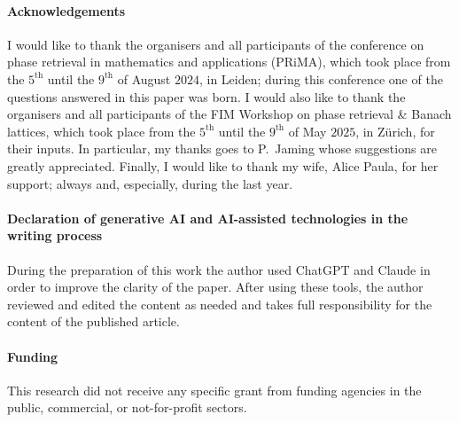 \documentclass{article}
\theoremstyle{remark}
\begin{document}
    \paragraph{Acknowledgements} I would like to thank the organisers and all participants of the conference on phase retrieval in mathematics and applications (PRiMA), which took place from the $5^\mathrm{th}$ until the $9^\mathrm{th}$ of August $2024$, in Leiden; during this conference one of the questions answered in this paper was born. I would also like to thank the organisers and all participants of the FIM Workshop on phase retrieval \& Banach lattices, which took place from the $5^\mathrm{th}$ until the $9^\mathrm{th}$ of May $2025$, in Z{\"u}rich, for their inputs. In particular, my thanks goes to P.~Jaming whose suggestions are greatly appreciated. Finally, I would like to thank my wife, Alice Paula, for her support; always and, especially, during the last year. 

    \paragraph{Declaration of generative AI and AI-assisted technologies in the writing process} During the preparation of this work the author used ChatGPT and Claude in order to improve the clarity of the paper. After using these tools, the author reviewed and edited the content as needed and takes full responsibility for the content of the published article.

    \paragraph{Funding} This research did not receive any specific grant from funding agencies in the public, commercial, or not-for-profit sectors.
 
    
    
\end{document}
